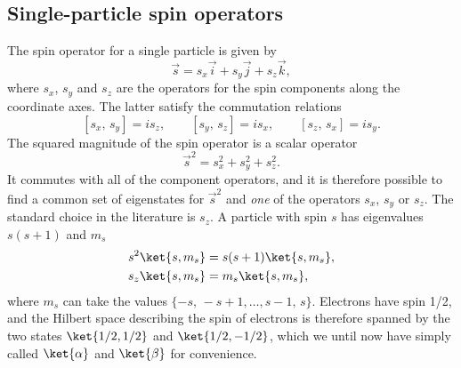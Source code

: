 \subsection{Single-particle spin operators}
The spin operator for a single particle is given by
\begin{equation}
 \vec s = s_x\vec i + s_y\vec j + s_z\vec k,
\end{equation}
where $s_x$, $s_y$ and $s_z$ are the operators for the spin components along the coordinate axes. The latter satisfy the commutation relations
\begin{equation}
\label{eq:spin_commutation}
 [s_x,\, s_y] = i s_z, \qquad [s_y,\, s_z] = i s_x, \qquad [s_z,\, s_x] = i s_y.
\end{equation}
The squared magnitude of the spin operator is a scalar operator
\begin{equation}
 \vec s^2 = s_x^2 + s_y^2 + s_z^2.
\end{equation}
It commutes with all of the component operators, and it is therefore possible to find a common set of eigenstates for
$\vec s^2$ and \emph{one} of the operators $s_x$, $s_y$ or $s_z$. The standard choice in the literature is $s_z$.
A particle with spin $s$ has eigenvalues $s(s+1)$ and $m_s$
\begin{equation}
\begin{split}
 s^2 \ket{s,m_s} & = s(s+1) \ket{s,m_s}, \\
 s_z \ket{s,m_s} & = m_s \ket{s,m_s},
\end{split}
\end{equation}
where $m_s$ can take the values $\{-s,\, -s+1,\dots, s-1,\,s\}$. Electrons have spin 1/2, and the Hilbert space describing the
spin of electrons is therefore spanned by the two states $\ket{1/2,1/2}$ and $\ket{1/2,-1/2}$, which we until now have simply called $\ket{\alpha}$
and $\ket{\beta}$ for convenience.



